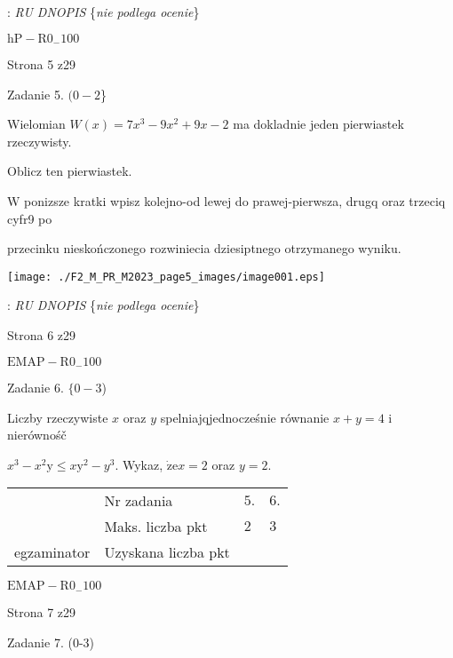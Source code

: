 \documentclass[a4paper,12pt]{article}
\begin{document}
: {\it RU DNOPIS} \{{\it nie podlega ocenie}\}

$\mathrm{h}\mathrm{P}-\mathrm{R}0_{-}100$

Strona 5 z29





Zadanie 5. $(0-2$\}

Wielomian $W(x)=7x^{3}-9x^{2}+9x-2$ ma dokladnie jeden pierwiastek rzeczywisty.

Oblicz ten pierwiastek.

$\mathrm{W}$ ponizsze kratki wpisz kolejno-od lewej do prawej-pierwsza, drugq oraz trzeciq cyfr9 po

przecinku nieskończonego rozwiniecia dziesiptnego otrzymanego wyniku.
\begin{center}
\texttt{[image: ./F2\_M\_PR\_M2023\_page5\_images/image001.eps]}
\end{center}
: {\it RU DNOPIS} \{{\it nie podlega ocenie}\}

Strona 6 z29

$\mathrm{E}\mathrm{M}\mathrm{A}\mathrm{P}-\mathrm{R}0_{-}100$





Zadanie 6. $\{0-3$)

Liczby rzeczywiste $x$ oraz $y$ spelniajqjednocześnie równanie $x+y=4$ i nierównośč

$x^{3}-x^{2}\mathrm{y}\leq x\mathrm{y}^{2}-y^{3}$. Wykaz, $\dot{\mathrm{z}}\mathrm{e} x=2$ oraz $y=2.$
\begin{center}
\begin{tabular}{|l|l|l|l|}
\cline{2-4}
&	\multicolumn{1}{|l|}{Nr zadania}&	\multicolumn{1}{|l|}{$5.$}&	\multicolumn{1}{|l|}{ $6.$}	\\
\cline{2-4}
&	\multicolumn{1}{|l|}{Maks. liczba pkt}&	\multicolumn{1}{|l|}{$2$}&	\multicolumn{1}{|l|}{ $3$}	\\
\cline{2-4}
\multicolumn{1}{|l|}{egzaminator}&	\multicolumn{1}{|l|}{Uzyskana liczba pkt}&	\multicolumn{1}{|l|}{}&	\multicolumn{1}{|l|}{}	\\
\hline
\end{tabular}

\end{center}
$\mathrm{E}\mathrm{M}\mathrm{A}\mathrm{P}-\mathrm{R}0_{-}100$

Strona 7 z29





Zadanie 7. (0-3)
\end{document}
